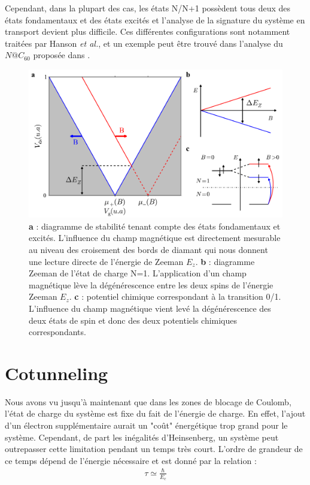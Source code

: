  Cependant, dans la plupart des cas, les états N/N+1 possèdent tous deux des états fondamentaux et des états excités et l'analyse de la signature du système en transport devient plus difficile. Ces différentes configurations sont notamment traitées par Hanson \textit{et al.}, et un exemple peut \^etre trouvé dans l'analyse du $N@C_{60}$ proposée dans \cite{Grose2008}.

\begin{figure}
\includegraphics[scale=0.5]{Theorie/Transport/figure4/figure4.pdf} 
\caption{ \textbf{a} : diagramme de stabilité tenant compte des états fondamentaux et excités. L'influence du champ magnétique est directement mesurable au niveau des croisement des bords de diamant qui nous donnent une lecture directe de l'énergie de Zeeman $E_z$. \textbf{b} : diagramme Zeeman de l'état de charge N=1. L'application d'un champ magnétique lève la dégénérescence entre les deux spins de l'énergie Zeeman $E_z$. \textbf{c} : potentiel chimique correspondant à la transition 0/1. L'influence du champ magnétique vient levé la dégénérescence des deux états de spin et donc des deux potentiels chimiques correspondants.}
\label{etat_excite}
\end{figure}

\section{Cotunneling}
Nous avons vu jusqu'à maintenant que dans les zones de blocage de Coulomb, l'état de charge du système est fixe du fait de l'énergie de charge. En effet, l'ajout d'un électron supplémentaire aurait un "co\^ut" énergétique trop grand pour le système. Cependant, de part les inégalités d'Heinsenberg, un système peut outrepasser cette limitation pendant un temps très court. L'ordre de grandeur de ce temps dépend de l'énergie nécessaire et est donné par la relation :
\begin{eqnarray}
\tau \simeq \frac{\hbar}{E_c} \nonumber
\end{eqnarray}


